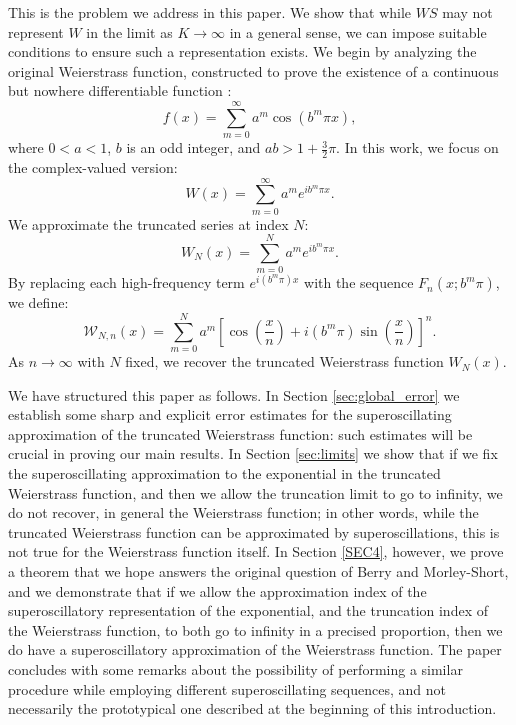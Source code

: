 \documentclass[reqno,11pt]{amsart}
\theoremstyle{definition}
\begin{document}
This is the problem we address in this paper. We show that while $WS$ may not represent $W$ in the limit as $K \to \infty$ in a general sense, we can impose suitable conditions to ensure such a representation exists. We begin by analyzing the original Weierstrass function, constructed to prove the existence of a continuous but nowhere differentiable function \cite{weierstrass}:
\begin{equation}
f(x) = \sum_{m=0}^{\infty} a^m \cos(b^m \pi x),
\end{equation}
where $0 < a < 1$, $b$ is an odd integer, and $ab > 1 + \frac{3}{2}\pi$. In this work, we focus on the complex-valued version:
\begin{equation} \label{eq:weierstrass_complex}
W(x) = \sum_{m=0}^{\infty} a^m e^{i b^m \pi x}.
\end{equation}
We approximate the truncated series at index $N$:
\begin{equation}\label{troncata}
W_N(x) = \sum_{m=0}^{N} a^m e^{i b^m \pi x}.
\end{equation}
By replacing each high-frequency term $e^{i (b^m \pi) x}$ with the sequence $F_n(x; b^m \pi)$, we define:
\begin{equation} \label{eq:super_weierstrass}
\mathcal{W}_{N, n}(x) = \sum_{m=0}^{N} a^m \left[ \cos\left(\frac{x}{n}\right) + i (b^m \pi) \sin\left(\frac{x}{n}\right) \right]^n.
\end{equation}
As $n \to \infty$ with $N$ fixed, we recover the truncated Weierstrass function $W_N(x)$.


\medskip
We have structured this paper as follows. In Section \ref{sec:global_error} we establish some sharp and explicit error estimates for the superoscillating approximation of the truncated Weierstrass function: such estimates will be crucial in proving our main results. In Section \ref{sec:limits} we show that if we fix the superoscillating approximation to the exponential in the truncated Weierstrass function, and then we allow the truncation limit to go to infinity, we do not recover, in general the Weierstrass function; in other words, while the truncated Weierstrass function can be approximated by superoscillations, this is not true for the Weierstrass function itself. In Section \ref{SEC4}, however, we prove a theorem that we hope answers the original question of Berry and Morley-Short, and we demonstrate that if we allow the approximation index of the superoscillatory representation of the exponential, and the truncation index of the Weierstrass function, to both go to infinity in a precised proportion, then we do have a superoscillatory approximation of the Weierstrass function. The paper concludes with some remarks about the possibility of performing a similar procedure while employing different superoscillating sequences, and not necessarily the prototypical one described at the beginning of this introduction.
\end{document}
